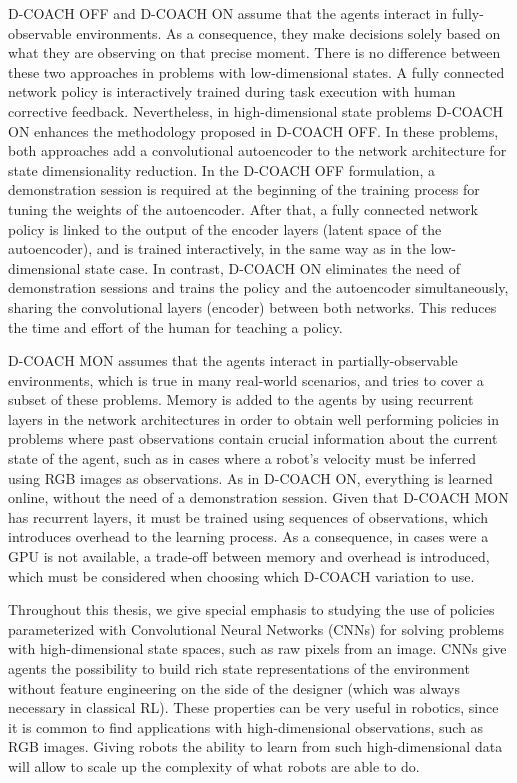 D-COACH OFF and D-COACH ON assume that the agents interact in fully-observable environments. As a consequence, they make decisions solely based on what they are observing on that precise moment. There is no difference between these two approaches in problems with low-dimensional states. A fully connected network policy is interactively trained during task execution with human corrective feedback. Nevertheless, in high-dimensional state problems D-COACH ON enhances the methodology proposed in D-COACH OFF. In these problems, both approaches add a convolutional autoencoder to the network architecture for state dimensionality reduction. In the D-COACH OFF formulation, a demonstration session is required at the beginning of the training process for tuning the weights of the autoencoder. After that, a fully connected network policy is linked to the output of the encoder layers (latent space of the autoencoder), and is trained interactively, in the same way as in the low-dimensional state case. In contrast, D-COACH ON eliminates the need of demonstration sessions and trains the policy and the autoencoder simultaneously, sharing the convolutional layers (encoder) between both networks. This reduces the time and effort of the human for teaching a policy.

D-COACH MON assumes that the agents interact in partially-observable environments, which is true in many real-world scenarios, and tries to cover a subset of these problems. Memory is added to the agents by using recurrent layers in the network architectures in order to obtain well performing policies in problems where past observations contain crucial information about the current state of the agent, such as in cases where a robot's velocity must be inferred using RGB images as observations. As in D-COACH ON, everything is learned online, without the need of a demonstration session. Given that D-COACH MON has recurrent layers, it must be trained using sequences of observations, which introduces overhead to the learning process. As a consequence, in cases were a GPU is not available, a trade-off between memory and overhead is introduced, which must be considered when choosing which D-COACH variation to use. 

Throughout this thesis, we give special emphasis to studying the use of policies parameterized with Convolutional Neural Networks (CNNs) for solving problems with high-dimensional state spaces, such as raw pixels from an image. CNNs give agents the possibility to build rich state representations of the environment without feature engineering on the side of the designer (which was always necessary in classical RL). These properties can be very useful in robotics, since it is common to find applications with high-dimensional observations, such as RGB images. Giving robots the ability to learn from such high-dimensional data will allow to scale up the complexity of what robots are able to do.

